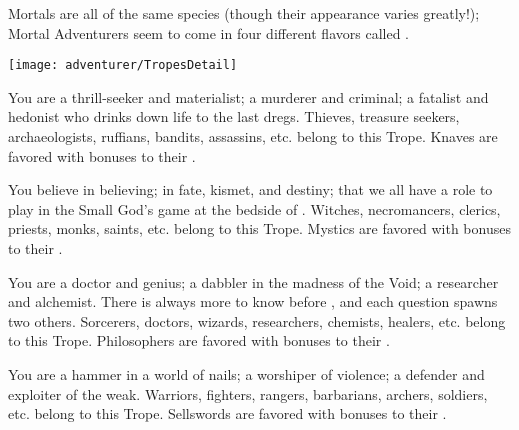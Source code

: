 \begin{multicols*}{2}\raggedcolumns




Mortals are all of the same species (though their appearance varies greatly!); Mortal Adventurers seem to come in four different flavors called .

\begin{center}
\texttt{[image: adventurer/TropesDetail]}
\end{center}


\cbreak

{You are a thrill-seeker and materialist; a murderer and criminal; a fatalist and hedonist who drinks down life to the last dregs. Thieves, treasure seekers, archaeologists, ruffians, bandits, assassins, etc. belong to this Trope. Knaves are favored with bonuses to their \DEX.}

{You believe in believing; in fate, kismet, and destiny; that we all have a role to play in the Small God's game at the bedside of \TheAuthority. Witches, necromancers, clerics, priests, monks, saints, etc. belong to this Trope. Mystics are favored with bonuses to their \FOC.}


{You are a doctor and genius; a dabbler in the madness of the Void; a researcher and alchemist. There is always more to know before \TheEnd, and each question spawns two others. Sorcerers, doctors, wizards, researchers, chemists, healers, etc. belong to this Trope. Philosophers are favored with bonuses to their \INT.}

{You are a hammer in a world of nails; a worshiper of violence; a defender and exploiter of the weak. Warriors, fighters, rangers, barbarians, archers, soldiers, etc. belong to this Trope. Sellswords are favored with bonuses to their \VIG.}      

\newpage



\end{multicols*}
